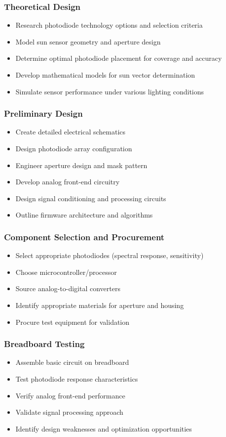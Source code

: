 \subsubsection*{Theoretical Design}
\begin{itemize}
  \item Research photodiode technology options and selection criteria
  \item Model sun sensor geometry and aperture design
  \item Determine optimal photodiode placement for coverage and accuracy
  \item Develop mathematical models for sun vector determination
  \item Simulate sensor performance under various lighting conditions
\end{itemize}

\subsubsection*{Preliminary Design}
\begin{itemize}
  \item Create detailed electrical schematics
  \item Design photodiode array configuration
  \item Engineer aperture design and mask pattern
  \item Develop analog front-end circuitry
  \item Design signal conditioning and processing circuits
  \item Outline firmware architecture and algorithms
\end{itemize}

\subsubsection*{Component Selection and Procurement}
\begin{itemize}
  \item Select appropriate photodiodes (spectral response, sensitivity)
  \item Choose microcontroller/processor
  \item Source analog-to-digital converters
  \item Identify appropriate materials for aperture and housing
  \item Procure test equipment for validation
\end{itemize}

\subsubsection*{Breadboard Testing}
\begin{itemize}
  \item Assemble basic circuit on breadboard
  \item Test photodiode response characteristics
  \item Verify analog front-end performance
  \item Validate signal processing approach
  \item Identify design weaknesses and optimization opportunities
\end{itemize}

